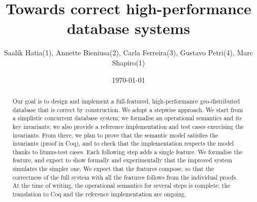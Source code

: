 \documentclass[systeme,french,english]{compas2022}
\begin{document}

\title{Towards correct high-performance database systems}

\author{Saalik Hatia(1), Annette Bieniusa(2), Carla Ferreira(3), Gustavo Petri(4), Marc Shapiro(1)}


\address{
  (1)~LIP6--Sorbonne-Université, Paris, France  \\
  (2)~TU Kaiserslautern, Germany \\
  (3)~Universidade NOVA de Lisboa, Portugal \\
  (4)~ARM, Cambridge, United Kingdom\\
  }

\date{\today}

\maketitle

\begin{abstract}
  Our goal is to design and implement a full-featured, high-performance
  geo-distributed database that is correct by construction.
  We adopt a stepwise approach.
  We start from a simplistic concurrent database system; we formalise an
  operational semantics and its key invariants; we also provide a
  reference implementation and test cases exercising the invariants.
  From there, we plan to prove that the semantic model satisfies the
  invariants (proof in Coq), and to check that the implementation respects
  the model thanks to litmus-test cases.
  Each following step adds a single feature.
  We formalise the feature, and expect to show formally and experimentally
  that the improved system simulates the simpler one.
  We expect that the features compose, so that the correctness of the full
  system with all the features follows from the individual proofs.
  At the time of writing, the operational semantics for several steps is
  complete; the translation to Coq and the reference implementation are
  ongoing.

\end{abstract}

\tableofcontents

\end{document}
